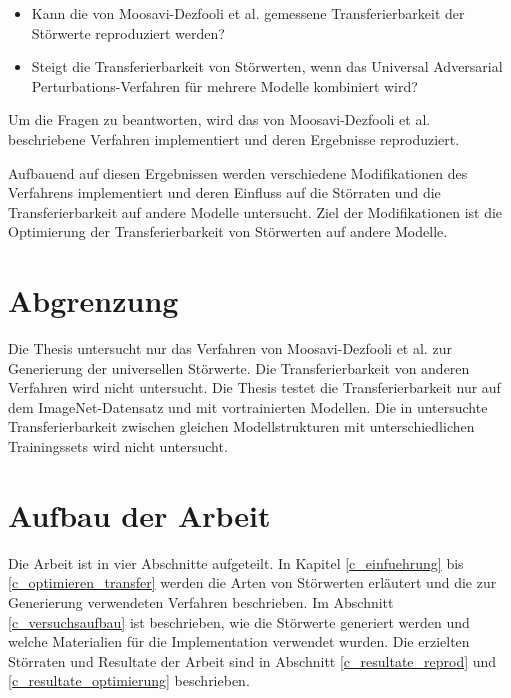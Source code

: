 \documentclass{FFHS_Thesis_Additions/ffhsthesis}
\begin{document}
\begin{itemize}
	\item Kann die von Moosavi-Dezfooli et al. gemessene Transferierbarkeit der Störwerte reproduziert werden?
	\item Steigt die Transferierbarkeit von Störwerten, wenn das Universal Adversarial Perturbations-Verfahren \cite{moosavi-dezfooli_universal_2017-1} für mehrere Modelle kombiniert wird?
\end{itemize}

Um die Fragen zu beantworten, wird das von Moosavi-Dezfooli et al. beschriebene Verfahren implementiert und deren Ergebnisse reproduziert. 

Aufbauend auf diesen Ergebnissen werden verschiedene Modifikationen des Verfahrens implementiert und deren Einfluss auf die Störraten und die Transferierbarkeit auf andere Modelle untersucht. 
Ziel der Modifikationen ist die Optimierung der Transferierbarkeit von Störwerten auf andere Modelle.

\section{Abgrenzung}

Die Thesis untersucht nur das Verfahren von Moosavi-Dezfooli et al. \cite{moosavi-dezfooli_universal_2017-1} zur Generierung der universellen Störwerte. 
Die Transferierbarkeit von anderen Verfahren wird nicht untersucht. 
Die Thesis testet die Transferierbarkeit nur auf dem ImageNet-Datensatz \cite{russakovsky_imagenet_2015} und mit vortrainierten Modellen.
 Die in \cite{papernot_transferability_2016} untersuchte Transferierbarkeit zwischen gleichen Modellstrukturen mit unterschiedlichen Trainingssets wird nicht untersucht.



\section{Aufbau der Arbeit}


Die Arbeit ist in vier Abschnitte aufgeteilt. 
In Kapitel \ref{c_einfuehrung} bis \ref{c_optimieren_transfer} werden die Arten von Störwerten erläutert und die zur Generierung verwendeten Verfahren beschrieben. 
Im Abschnitt \ref{c_versuchsaufbau} ist beschrieben, wie die Störwerte generiert werden und welche Materialien für die Implementation verwendet wurden. 
Die erzielten Störraten und Resultate der Arbeit sind in Abschnitt \ref{c_resultate_reprod} und \ref{c_resultate_optimierung} beschrieben.
\end{document}
